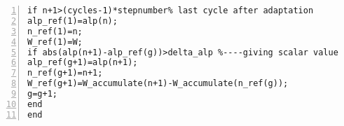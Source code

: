 \begin{lstlisting}[numbers=left, numberstyle=\tiny, keywordstyle=\color{blue!100}, commentstyle=\color{red!30!green!100!blue!100}, frame=shadowbox, rulesepcolor=\color{red!20!green!20!blue!20}]
if n+1>(cycles-1)*stepnumber% last cycle after adaptation
alp_ref(1)=alp(n);
n_ref(1)=n;
W_ref(1)=W;
if abs(alp(n+1)-alp_ref(g))>delta_alp %----giving scalar value to iteration after the addaptation cycle(decrease time step)
alp_ref(g+1)=alp(n+1);
n_ref(g+1)=n+1;
W_ref(g+1)=W_accumulate(n+1)-W_accumulate(n_ref(g));
g=g+1;
end
end

\end{lstlisting}

